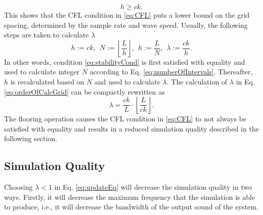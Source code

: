 \begin{equation}\label{eq:stabilityCond}
    h \geq ck.
\end{equation}
This shows that the CFL condition in \eqref{eq:CFL} puts a lower bound on the grid spacing, determined by the sample rate and wave speed. Usually, the following steps are taken to calculate $\lambda$
\begin{equation}\label{eq:orderOfCalcGrid}
    h := ck,\ \ N := \left\lfloor\frac{L}{h}\right\rfloor, \ \ h := \frac{L}{N}, \ \ \lambda := \frac{ck}{h}.
\end{equation}
In other words, condition \eqref{eq:stabilityCond} is first satisfied with equality and used to calculate integer $N$ according to Eq. \eqref{eq:numberOfIntervals}. Thereafter, $h$ is recalculated based on $N$ and used to calculate $\lambda$. The calculation of $\lambda$ in Eq. \eqref{eq:orderOfCalcGrid} can be compactly rewritten as
\begin{equation}\label{eq:compactLambda}
    \lambda = \frac{ck}{L}\cdot\left\lfloor\frac{L}{ck}\right\rfloor.
\end{equation}
The flooring operation causes the CFL condition in \eqref{eq:CFL} to not always be satisfied with equality and results in a reduced simulation quality described in the following section.

\subsection{Simulation Quality}\label{sec:quality}
Choosing $\lambda < 1$ in Eq. \eqref{eq:updateEq} will decrease the simulation quality in two ways. Firstly, it will decrease the maximum frequency that the simulation is able to produce, i.e., it will decrease the bandwidth of the output sound of the system. 

